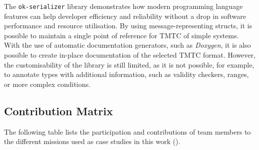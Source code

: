 \documentclass[a4paper,nobib,justified,final]{tufte-book}
\begin{document}
The \texttt{ok-serializer} library demonstrates how modern programming language features can help developer efficiency and reliability without a drop in software performance and resource utilisation. By using message-representing structs, it is possible to maintain a single point of reference for \acs{TMTC} of simple systems. With the use of automatic documentation generators, such as \emph{Doxygen}, it is also possible to create in-place documentation of the selected \acs{TMTC} format. However, the customisability of the library is still limited, as it is not possible, for example, to annotate types with additional information, such as validity checkers, ranges, or more complex conditions.

\begin{fullwidth}

\chapter{Contribution Matrix}
\label{app:contribution_matrix}

The following table lists the participation and contributions of team members to the different missions used as case studies in this work ().

\begin{table}[h]
	\caption{Contribution matrix for the various case studies investigated within the scope of this work}
	
	

\end{table}
\end{fullwidth}
\end{document}

